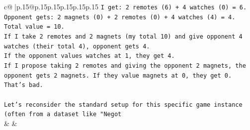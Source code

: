 \documentclass{article}
\begin{document}
{\begin{supertabular}{c@{$\;$}|p{.15\linewidth}@{}p{.15\linewidth}p{.15\linewidth}p{.15\linewidth}p{.15\linewidth}p{.15\linewidth}}
{{{\texttt{I get: 2 remotes (6) + 4 watches (0) = 6.} \\
\texttt{Opponent gets: 2 magnets (0) + 2 remotes (0) + 4 watches (4) = 4.} \\
\texttt{Total value = 10.} \\
\texttt{If I take 2 remotes and 2 magnets (my total 10) and give opponent 4 watches (their total 4), opponent gets 4.} \\
\texttt{If the opponent values watches at 1, they get 4.} \\
\texttt{If I propose taking 2 remotes and giving the opponent 2 magnets, the opponent gets 2 magnets. If they value magnets at 0, they get 0. That's bad.} \\
\\ 
\texttt{Let's reconsider the standard setup for this specific game instance (often from a dataset like "Negot} \\
            }
        }
    }
    & & \\ \\


\end{supertabular}}
\end{document}
